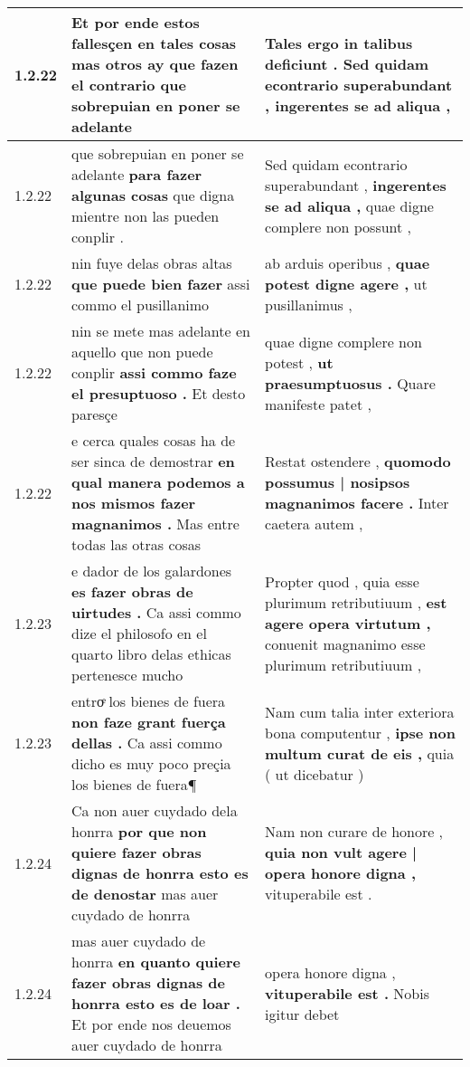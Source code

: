 \begin{tabular}{|p{1cm}|p{6.5cm}|p{6.5cm}|}
1.2.22 & Et por ende estos fallesçen en tales cosas \textbf{ mas otros ay que fazen el contrario } que sobrepuian en poner se adelante & Tales ergo in talibus deficiunt . \textbf{ Sed quidam econtrario superabundant , } ingerentes se ad aliqua , \\\hline
1.2.22 & que sobrepuian en poner se adelante \textbf{ para fazer algunas cosas } que digna mientre non las pueden conplir . & Sed quidam econtrario superabundant , \textbf{ ingerentes se ad aliqua , } quae digne complere non possunt , \\\hline
1.2.22 & nin fuye delas obras altas \textbf{ que puede bien fazer } assi commo el pusillanimo & ab arduis operibus , \textbf{ quae potest digne agere , } ut pusillanimus , \\\hline
1.2.22 & nin se mete mas adelante en aquello que non puede conplir \textbf{ assi commo faze el presuptuoso . } Et desto paresçe & quae digne complere non potest , \textbf{ ut praesumptuosus . } Quare manifeste patet , \\\hline
1.2.22 & e cerca quales cosas ha de ser sinca de demostrar \textbf{ en qual manera podemos a nos mismos fazer magnanimos . } Mas entre todas las otras cosas & Restat ostendere , \textbf{ quomodo possumus | nosipsos magnanimos facere . } Inter caetera autem , \\\hline
1.2.23 & e dador de los galardones \textbf{ es fazer obras de uirtudes . } Ca assi commo dize el philosofo en el quarto libro delas ethicas pertenesce mucho & Propter quod , quia esse plurimum retributiuum , \textbf{ est agere opera virtutum , } conuenit magnanimo esse plurimum retributiuum , \\\hline
1.2.23 & entroͤ los bienes de fuera \textbf{ non faze grant fuerça dellas . } Ca assi commo dicho es muy poco preçia los bienes de fuera¶ & Nam cum talia inter exteriora bona computentur , \textbf{ ipse non multum curat de eis , } quia ( ut dicebatur ) \\\hline
1.2.24 & Ca non auer cuydado dela honrra \textbf{ por que non quiere fazer obras dignas de honrra esto es de denostar } mas auer cuydado de honrra & Nam non curare de honore , \textbf{ quia non vult agere | opera honore digna , } vituperabile est . \\\hline
1.2.24 & mas auer cuydado de honrra \textbf{ en quanto quiere fazer obras dignas de honrra esto es de loar . } Et por ende nos deuemos auer cuydado de honrra & opera honore digna , \textbf{ vituperabile est . } Nobis igitur debet \\\hline

\end{tabular}
